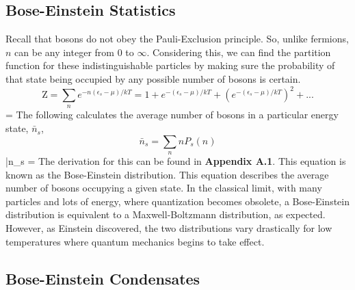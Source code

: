 \subsection{Bose-Einstein Statistics}

Recall that bosons do not obey the Pauli-Exclusion principle. So, unlike fermions, $n$ can be any integer from $0$ to $\infty$. Considering this, we can find the partition function for these indistinguishable particles by making sure the probability of that state being occupied by any possible number of bosons is certain.
$$\mathrm{Z} = \sum_n{e^{-n(\epsilon_s-\mu) /kT}}= 1 + e^{-(\epsilon_s-\mu) /kT} + \left( e^{-(\epsilon_s-\mu) /kT} \right)^2 + ... $$
\beq
{}= 
\eeq
\newline
The following calculates the average number of bosons in a particular energy state, $\bar{n}_s$,
$$\bar{n}_s = \sum_n{nP_s(n)} $$
\beq
\bar{n}_s = 
\eeq
The derivation for this can be found in \textbf{Appendix A.1}. This equation is known as the Bose-Einstein distribution. This equation describes the average number of bosons occupying a given state. In the classical limit, with many particles and lots of energy, where quantization becomes obsolete, a Bose-Einstein distribution is equivalent to a Maxwell-Boltzmann distribution, as expected. However, as Einstein discovered, the two distributions vary drastically for low temperatures where quantum mechanics begins to take effect. 
\newline

\subsection{Bose-Einstein Condensates}

